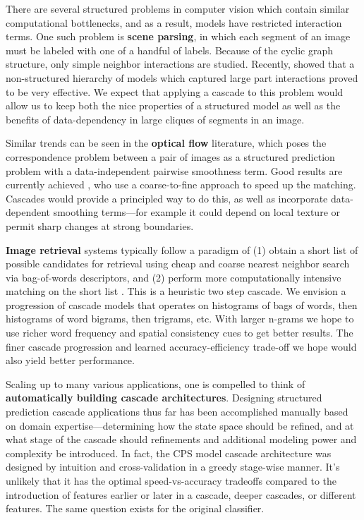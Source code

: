 There are several structured problems in computer vision which contain similar 
computational bottlenecks, and as a result, models have restricted interaction 
terms.  One such problem is \textbf{scene parsing}, in which each segment of an 
image must be labeled with one of a handful of labels.  Because of the cyclic 
graph structure, only simple neighbor interactions are studied.  Recently, 
\citet{munoz10} showed that a non-structured hierarchy of models which captured 
large part interactions proved to be very effective.  We expect that applying a 
cascade to this problem would allow us to keep both the nice properties of a 
structured model as well as the benefits of data-dependency in large cliques of 
segments in an image.

Similar trends can be seen in the \textbf{optical flow} literature, which poses 
the correspondence problem between a pair of images as a structured prediction 
problem with a data-independent pairwise smoothness term.  Good results are 
currently achieved \citet{liu2011sift}, who use a coarse-to-fine approach to 
speed up the matching.  Cascades would provide a principled way to do this, as 
well as incorporate data-dependent smoothing terms---for example it could 
depend on local texture or permit sharp changes at strong boundaries.

\textbf{Image retrieval} systems typically follow a paradigm of (1) obtain a 
short list of possible candidates for retrieval using cheap and coarse nearest 
neighbor search via bag-of-words descriptors, and (2) perform more 
computationally intensive matching on the short list 
\citep{wang2011contextual}.  This is a heuristic two step cascade.  We envision 
a progression of cascade models that operates on histograms of bags of words, 
then histograms of word bigrams, then trigrams, etc. With larger n-grams we 
hope to use richer word frequency and spatial consistency cues to get better 
results.  The finer cascade progression and learned accuracy-efficiency 
trade-off we hope would also yield better performance.

Scaling up to many various applications, one is compelled to think of 
\textbf{automatically building cascade architectures}.  Designing structured 
prediction cascade applications thus far has been accomplished manually based 
on domain expertise---determining how the state space should be refined, and at 
what stage of the cascade should refinements and additional modeling power and 
complexity be introduced.  In fact, the CPS model cascade architecture was 
designed by intuition and cross-validation in a greedy stage-wise manner.  It's 
unlikely that it has the optimal speed-vs-accuracy tradeoffs compared to the 
introduction of features earlier or later in a cascade, deeper cascades,  or 
different features. The same question exists for the original \citet{viola02} 
classifier.

